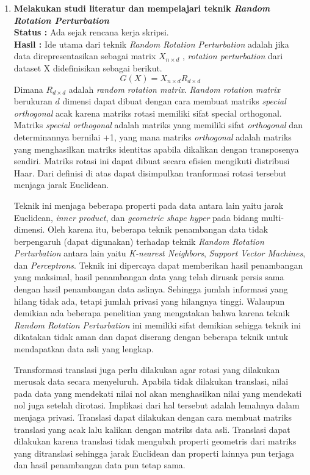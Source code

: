 \documentclass[a4paper,twoside]{article}
\begin{document}
\begin{enumerate}
		\item \textbf{Melakukan studi literatur dan mempelajari teknik \textit{Random Rotation Perturbation}}\\
		{\bf Status :} Ada sejak rencana kerja skripsi.\\
		{\bf Hasil :} Ide utama dari teknik \textit{Random Rotation Perturbation} adalah jika data direpresentasikan sebagai matrix \(X_{n \times d}\) , \textit{rotation perturbation} dari dataset X didefinisikan sebagai berikut.
		\begin{equation}
			G(X) = X_{n \times d} R_{d \times d}
		\end{equation}
		Dimana \(R_{d \times d}\) adalah \textit{random rotation matrix}. \textit{Random rotation matrix} berukuran \(d\) dimensi dapat dibuat dengan cara membuat matriks \textit{special orthogonal} acak karena matriks rotasi memiliki sifat {special orthogonal}. Matriks \textit{special orthogonal} adalah matriks yang memiliki sifat \textit{orthogonal} dan determinannya bernilai +1, yang mana matriks \textit{orthogonal} adalah matriks yang menghasilkan matriks identitas apabila dikalikan dengan transposenya sendiri. Matriks rotasi ini dapat dibuat secara efisien mengikuti distribusi Haar. Dari definisi di atas dapat disimpulkan tranformasi rotasi tersebut menjaga jarak Euclidean.
		
		Teknik ini menjaga beberapa properti pada data antara lain yaitu jarak Euclidean, \textit{inner product}, dan \textit{geometric shape hyper} pada bidang multi-dimensi. Oleh karena itu, beberapa teknik penambangan data tidak berpengaruh (dapat digunakan) terhadap teknik \textit{Random Rotation Perturbation} antara lain yaitu \textit{K-nearest Neighbors}, \textit{Support Vector Machines}, dan \textit{Perceptrons}. Teknik ini dipercaya dapat memberikan hasil penambangan yang maksimal, hasil penambangan data yang telah dirusak persis sama dengan hasil penambangan data aslinya. Sehingga jumlah informasi yang hilang tidak ada, tetapi jumlah privasi yang hilangnya tinggi. Walaupun demikian ada beberapa penelitian yang mengatakan bahwa karena teknik \textit{Random Rotation Perturbation} ini memiliki sifat demikian sehigga teknik ini dikatakan tidak aman dan dapat diserang dengan beberapa teknik untuk mendapatkan data asli yang lengkap.
		
		Transformasi translasi juga perlu dilakukan agar rotasi yang dilakukan merusak data secara menyeluruh. Apabila tidak dilakukan translasi, nilai pada data yang mendekati nilai nol akan menghasilkan nilai yang mendekati nol juga setelah dirotasi. Implikasi dari hal tersebut adalah lemahnya dalam menjaga privasi. Translasi dapat dilakukan dengan cara membuat matriks translasi yang acak lalu kalikan dengan matriks data asli. Translasi dapat dilakukan karena translasi tidak mengubah properti geometris dari matriks yang ditranslasi sehingga jarak Euclidean dan properti lainnya pun terjaga dan hasil penambangan data pun tetap sama.


\end{enumerate}
\end{document}

